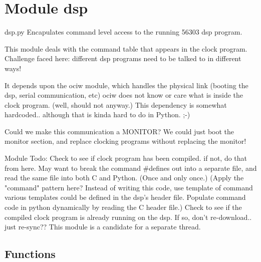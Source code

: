 %
%
%


\section{Module dsp}

    \label{dsp}
dsp.py Encapulates command level access to the running 56303 dsp program.

This module deals with the command table that appears in the clock program.
Challenge faced here: different dsp programs need to be talked to in 
different ways!

It depends upon the ociw module, which handles the physical link (booting 
the dsp, serial communication, etc) ociw does not know or care what is 
inside the clock program. (well, should not anyway.) This dependency is 
somewhat hardcoded.. although that is kinda hard to do in Python. ;-)

Could we make this communication a MONITOR? We could just boot the monitor 
section, and replace clocking programs without replacing the monitor!

Module Todo: Check to see if clock program has been compiled. if not, do 
that from here. May want to break the command \#defines out into a separate
file, and read the same file into both C and Python. (Once and only once.) 
(Apply the "command" pattern here? Instead of writing this code, use 
template of command various templates could be defined in the dsp's header 
file. Populate command code in python dynamically by reading the C header 
file.) Check to see if the compiled clock program is already running on the
dsp. If so, don't re-download.. just re-sync?? This module is a candidate 
for a separate thread.



  \subsection{Functions}


